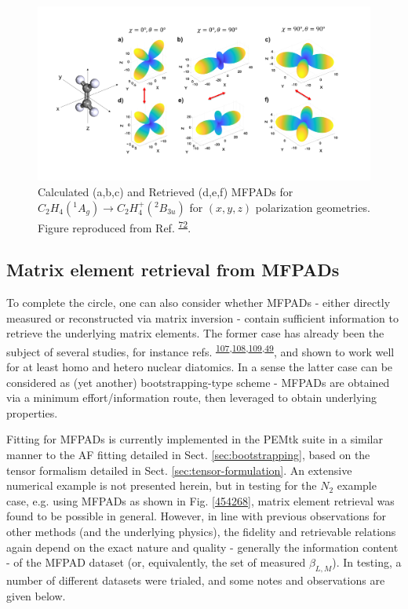 \documentclass[10pt]{article}
\begin{document}
\begin{figure}[H]
\begin{center}
\includegraphics[width=1.00\columnwidth]{figures/D2h1/D2h1}
\caption{{Calculated (a,b,c) and Retrieved (d,e,f) MFPADs for \(C_2 H_4(^1A_g) \rightarrow C_2H_4^+(^2B_{3u})\)
for \((x,y,z)\) polarization geometries. Figure reproduced from
Ref. \protect\textsuperscript{\hyperref[csl:72]{72}}.
{\label{584598}}%
}}
\end{center}
\end{figure}

\subsection{Matrix element retrieval from MFPADs\label{sec:recon-from-MFPADs}}

To complete the circle, one can also consider whether MFPADs - either directly measured or reconstructed via matrix inversion - contain sufficient information to retrieve the underlying matrix elements.  The former case has already been the subject of several studies, for instance refs. \textsuperscript{\hyperref[csl:107]{107},\hyperref[csl:108]{108},\hyperref[csl:109]{109},\hyperref[csl:49]{49}}, and shown to work well for at least homo and hetero nuclear diatomics. In a sense the latter case can be considered as (yet another) bootstrapping-type scheme - MFPADs are obtained via a minimum effort/information route, then leveraged to obtain underlying properties. 

Fitting for MFPADs is currently implemented in the PEMtk suite in a similar manner to the AF fitting detailed in Sect. \ref{sec:bootstrapping}, based on the tensor formalism detailed in Sect. \ref{sec:tensor-formulation}. An extensive numerical example is not presented herein, but in testing for the $N_{2}$ example case, e.g. using MFPADs as shown in Fig. \ref{454268}, matrix element retrieval was found to be possible in general. However, in line with previous observations for other methods (and the underlying physics), the fidelity and retrievable relations again depend on the exact nature and quality - generally the information content - of the MFPAD dataset (or, equivalently, the set of measured $\beta_{L,M}$). In testing, a number of different datasets were trialed, and some notes and observations are given below.
\end{document}
